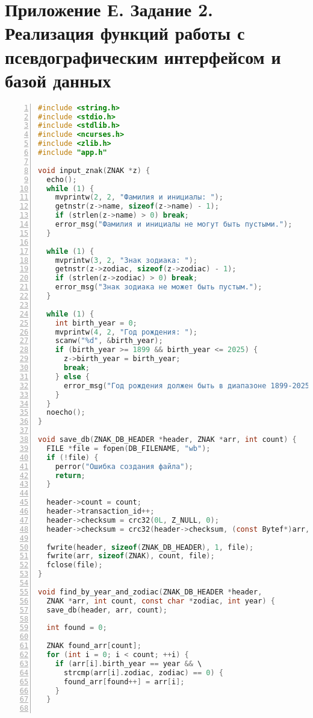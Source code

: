 \section*{Приложение Е. Задание 2. Реализация функций работы с псевдографическим интерфейсом и базой данных}

\begin{lstlisting}[language=C,numbers=left]
#include <string.h>
#include <stdio.h>
#include <stdlib.h>
#include <ncurses.h>
#include <zlib.h>
#include "app.h"

void input_znak(ZNAK *z) {
  echo();
  while (1) {
    mvprintw(2, 2, "Фамилия и инициалы: ");
    getnstr(z->name, sizeof(z->name) - 1);
    if (strlen(z->name) > 0) break;
    error_msg("Фамилия и инициалы не могут быть пустыми.");
  }

  while (1) {
    mvprintw(3, 2, "Знак зодиака: ");
    getnstr(z->zodiac, sizeof(z->zodiac) - 1);
    if (strlen(z->zodiac) > 0) break;
    error_msg("Знак зодиака не может быть пустым.");
  }

  while (1) {
    int birth_year = 0;
    mvprintw(4, 2, "Год рождения: ");
    scanw("%d", &birth_year);
    if (birth_year >= 1899 && birth_year <= 2025) {
      z->birth_year = birth_year;
      break;
    } else {
      error_msg("Год рождения должен быть в диапазоне 1899-2025.");
    }
  }
  noecho();
}

void save_db(ZNAK_DB_HEADER *header, ZNAK *arr, int count) {
  FILE *file = fopen(DB_FILENAME, "wb");
  if (!file) {
    perror("Ошибка создания файла");
    return;
  }

  header->count = count;
  header->transaction_id++;
  header->checksum = crc32(0L, Z_NULL, 0);
  header->checksum = crc32(header->checksum, (const Bytef*)arr, sizeof(ZNAK) * count);

  fwrite(header, sizeof(ZNAK_DB_HEADER), 1, file);
  fwrite(arr, sizeof(ZNAK), count, file);
  fclose(file);
}

void find_by_year_and_zodiac(ZNAK_DB_HEADER *header, 
  ZNAK *arr, int count, const char *zodiac, int year) {
  save_db(header, arr, count);

  int found = 0;

  ZNAK found_arr[count];
  for (int i = 0; i < count; ++i) {
    if (arr[i].birth_year == year && \
      strcmp(arr[i].zodiac, zodiac) == 0) {
      found_arr[found++] = arr[i];
    }
  }
  

\end{lstlisting}
